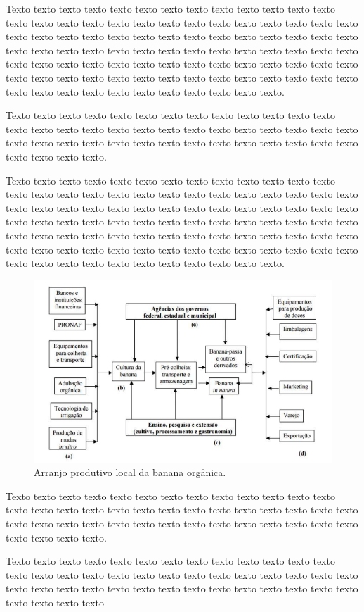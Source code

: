 Texto texto texto texto texto texto texto texto texto texto texto texto texto texto 
texto texto texto texto texto texto texto texto texto texto texto texto texto texto texto 
texto texto texto texto texto texto texto texto texto texto texto texto texto texto texto 
texto texto texto texto texto texto texto texto texto texto texto texto texto texto texto 
texto texto texto texto texto texto texto texto texto texto texto texto texto texto texto 
texto texto texto texto texto texto texto texto texto texto texto texto texto texto texto 
texto texto texto texto texto. 

Texto texto texto texto texto texto texto texto texto texto texto texto texto texto 
texto texto texto texto texto texto texto texto texto texto texto texto texto texto texto 
texto texto texto texto texto texto texto texto texto texto texto texto texto texto texto 
texto. 

Texto texto texto texto texto texto texto texto texto texto texto texto texto texto texto texto texto texto texto texto texto texto texto texto texto texto texto texto texto texto texto texto texto texto texto texto texto texto texto texto texto texto texto texto texto texto texto texto texto texto texto texto texto texto texto texto texto texto texto texto texto texto texto texto texto texto texto texto texto texto texto texto texto texto texto texto texto texto texto texto texto texto texto texto texto texto texto texto texto texto texto texto texto texto. 



\begin{figure}[H]
	\caption{\label{fig_arranjo}Arranjo produtivo local da banana orgânica.}
	\begin{center}
	    \includegraphics[scale=1.0]{imagens/fig_exemplo.png}
	\end{center}
\end{figure}


Texto texto texto texto texto texto texto texto texto texto texto texto texto texto 
texto texto texto texto texto texto texto texto texto texto texto texto texto texto texto 
texto texto texto texto texto texto texto texto texto texto texto texto texto texto texto 
texto. 

Texto texto texto texto texto texto texto texto texto texto texto texto texto texto 
texto texto texto texto texto texto texto texto texto texto texto texto texto texto texto 
texto texto texto texto texto texto texto texto texto texto texto texto texto texto texto 
texto